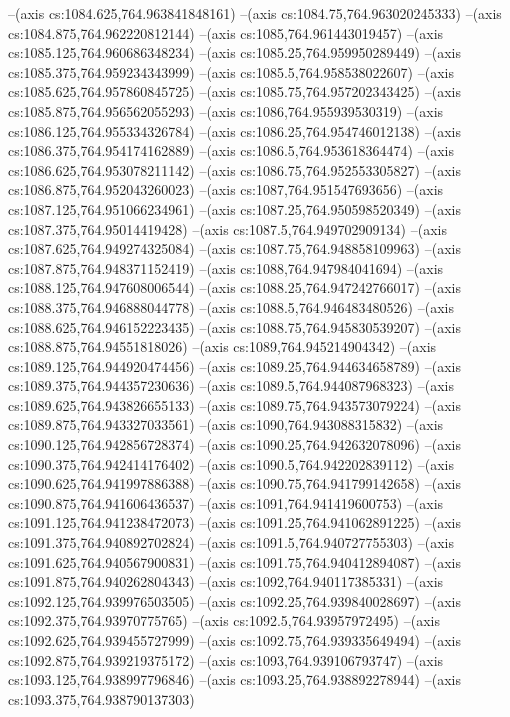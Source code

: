 --(axis cs:1084.625,764.963841848161)
--(axis cs:1084.75,764.963020245333)
--(axis cs:1084.875,764.962220812144)
--(axis cs:1085,764.961443019457)
--(axis cs:1085.125,764.960686348234)
--(axis cs:1085.25,764.959950289449)
--(axis cs:1085.375,764.959234343999)
--(axis cs:1085.5,764.958538022607)
--(axis cs:1085.625,764.957860845725)
--(axis cs:1085.75,764.957202343425)
--(axis cs:1085.875,764.956562055293)
--(axis cs:1086,764.955939530319)
--(axis cs:1086.125,764.955334326784)
--(axis cs:1086.25,764.954746012138)
--(axis cs:1086.375,764.954174162889)
--(axis cs:1086.5,764.953618364474)
--(axis cs:1086.625,764.953078211142)
--(axis cs:1086.75,764.952553305827)
--(axis cs:1086.875,764.952043260023)
--(axis cs:1087,764.951547693656)
--(axis cs:1087.125,764.951066234961)
--(axis cs:1087.25,764.950598520349)
--(axis cs:1087.375,764.95014419428)
--(axis cs:1087.5,764.949702909134)
--(axis cs:1087.625,764.949274325084)
--(axis cs:1087.75,764.948858109963)
--(axis cs:1087.875,764.948371152419)
--(axis cs:1088,764.947984041694)
--(axis cs:1088.125,764.947608006544)
--(axis cs:1088.25,764.947242766017)
--(axis cs:1088.375,764.946888044778)
--(axis cs:1088.5,764.946483480526)
--(axis cs:1088.625,764.946152223435)
--(axis cs:1088.75,764.945830539207)
--(axis cs:1088.875,764.94551818026)
--(axis cs:1089,764.945214904342)
--(axis cs:1089.125,764.944920474456)
--(axis cs:1089.25,764.944634658789)
--(axis cs:1089.375,764.944357230636)
--(axis cs:1089.5,764.944087968323)
--(axis cs:1089.625,764.943826655133)
--(axis cs:1089.75,764.943573079224)
--(axis cs:1089.875,764.943327033561)
--(axis cs:1090,764.943088315832)
--(axis cs:1090.125,764.942856728374)
--(axis cs:1090.25,764.942632078096)
--(axis cs:1090.375,764.942414176402)
--(axis cs:1090.5,764.942202839112)
--(axis cs:1090.625,764.941997886388)
--(axis cs:1090.75,764.941799142658)
--(axis cs:1090.875,764.941606436537)
--(axis cs:1091,764.941419600753)
--(axis cs:1091.125,764.941238472073)
--(axis cs:1091.25,764.941062891225)
--(axis cs:1091.375,764.940892702824)
--(axis cs:1091.5,764.940727755303)
--(axis cs:1091.625,764.940567900831)
--(axis cs:1091.75,764.940412894087)
--(axis cs:1091.875,764.940262804343)
--(axis cs:1092,764.940117385331)
--(axis cs:1092.125,764.939976503505)
--(axis cs:1092.25,764.939840028697)
--(axis cs:1092.375,764.93970775765)
--(axis cs:1092.5,764.93957972495)
--(axis cs:1092.625,764.939455727999)
--(axis cs:1092.75,764.939335649494)
--(axis cs:1092.875,764.939219375172)
--(axis cs:1093,764.939106793747)
--(axis cs:1093.125,764.938997796846)
--(axis cs:1093.25,764.938892278944)
--(axis cs:1093.375,764.938790137303)
